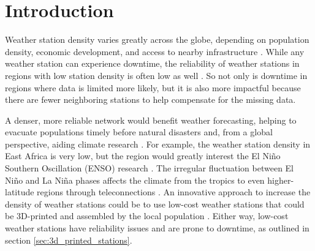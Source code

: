 \section{Introduction}
\label{sec:introduction}


Weather station density varies greatly across the globe, depending on population density, economic development, and access to nearby infrastructure \cite{ortizbobea2021}.
While any weather station can experience downtime, the reliability of weather stations in regions with low station density is often low as well \cite{Mistry2022GlobalWeatherStations}.
So not only is downtime in regions where data is limited more likely, but it is also more impactful because there are fewer neighboring stations to help compensate for the missing data.

A denser, more reliable network would benefit weather forecasting, helping to evacuate populations timely before natural disasters \cite{muita2021} and, from a global perspective, aiding climate research \cite{marchant2007}.
For example, the weather station density in East Africa is very low, but the region would greatly interest the El Niño Southern Oscillation (ENSO) research \cite{marchant2007, muita2021}.
The irregular fluctuation between El Niño and La Niña phases affects the climate from the tropics to even higher-latitude regions through teleconnections \cite{marchant2007}.
An innovative approach to increase the density of weather stations could be to use low-cost weather stations that could be 3D-printed and assembled by the local population \cite{muita2021}.
Either way, low-cost weather stations have reliability issues and are prone to downtime, as outlined in section \ref{sec:3d_printed_stations}.


